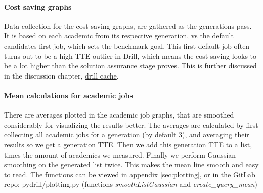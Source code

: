 \documentclass[a4paper,english]{report}
\begin{document}
	\paragraph{Cost saving graphs}
	Data collection for the cost saving graphs, are gathered as the generations pass. It is based on each academic from its respective generation, vs the default candidates first job, which sets the benchmark goal. This first default job often turns out to be a high TTE outlier in Drill, which means the cost saving looks to be a lot higher than the solution assurance stage proves. This is further discussed in the discussion chapter, \hyperref[sec:cache]{drill cache}.
	\paragraph{Mean calculations for academic jobs}
	There are averages plotted in the academic job graphs, that are smoothed considerably for visualizing the results better. The averages are calculated by first collecting all academic jobs for a generation (by default 3), and averaging their results so we get a generation TTE. Then we add this generation TTE to a list, times the amount of academics we measured. Finally we perform Gaussian smoothing on the generated list twice. This makes the mean line smooth and easy to read. The functions can be viewed in appendix \ref{sec:plotting}, or in the GitLab repo: pydrill/plotting.py (functions \textit{smoothListGaussian} and \textit{create\_query\_mean})
	\clearpage
\end{document}

